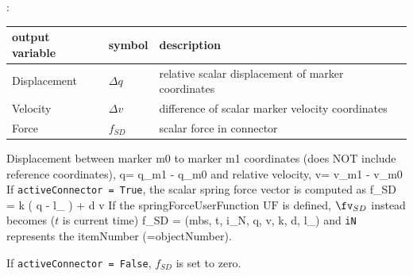 :
\begin{center}
\footnotesize
\begin{longtable}{| p{5cm} | p{5cm} | p{6cm} |} 
\hline
\bf output variable & \bf symbol & \bf description \\ \hline
Displacement & $\Delta q$ & relative scalar displacement of marker coordinates\\ \hline
Velocity & $\Delta v$ & difference of scalar marker velocity coordinates\\ \hline
Force & $f_{SD}$ & scalar force in connector\\ \hline
\end{longtable}
\end{center}
 \noindent
    \finishTable
    Displacement between marker m0 to marker m1 coordinates (does NOT include reference coordinates),
    \be
      \Delta q= q_{m1} - q_{m0}
    \ee
    and relative velocity,
    \be
      \Delta v= v_{m1} - v_{m0}
    \ee
    If \texttt{activeConnector = True}, the scalar spring force vector is computed as
    \be
      f_{SD} = k \left( \Delta q - l_ \right) + d \cdot \Delta v %
    \ee
    If the springForceUserFunction $\mathrm{UF}$ is defined, $\fv_{SD}$ instead becomes ($t$ is current time)
    \be
      f_{SD} = (mbs, t, i_N, \Delta q, \Delta v, k, d, l_)%
    \ee
    and \texttt{iN} represents the itemNumber (=objectNumber).

    If \texttt{activeConnector = False}, $f_{SD}$ is set to zero.

